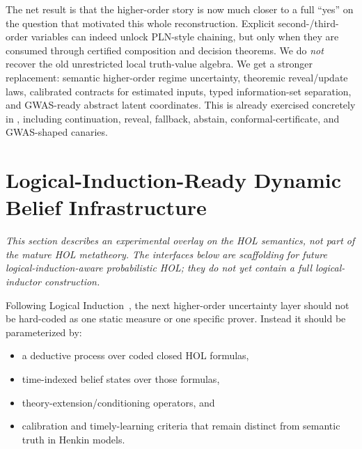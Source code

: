 \documentclass[11pt,openany]{report}
\begin{document}
The net result is that the higher-order story is now much closer to a full
``yes'' on the question that motivated this whole reconstruction.  Explicit
second-/third-order variables can indeed unlock PLN-style chaining, but only
when they are consumed through certified composition and decision theorems.  We
do \emph{not} recover the old unrestricted local truth-value algebra.  We get a
stronger replacement: semantic higher-order regime uncertainty, theoremic
reveal/update laws, calibrated contracts for estimated inputs, typed
information-set separation, and GWAS-ready abstract latent coordinates.  This
is already exercised concretely in
,
including continuation, reveal, fallback, abstain, conformal-certificate, and
GWAS-shaped canaries.

\section{Logical-Induction-Ready Dynamic Belief Infrastructure}

\emph{This section describes an experimental overlay on the HOL semantics, not
part of the mature HOL metatheory.  The interfaces below are scaffolding for
future logical-induction-aware probabilistic HOL; they do not yet contain a
full logical-inductor construction.}

\medskip

Following Logical Induction~\cite{Garrabrant2020LogicalInduction}, the next
higher-order uncertainty layer should not be hard-coded as one static measure
or one specific prover.  Instead it should be parameterized by:
\begin{itemize}
\item a deductive process over coded closed HOL formulas,
\item time-indexed belief states over those formulas,
\item theory-extension/conditioning operators, and
\item calibration and timely-learning criteria that remain distinct from
  semantic truth in Henkin models.
\end{itemize}
\end{document}

